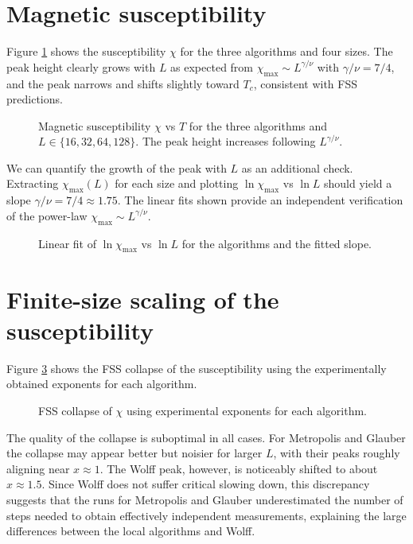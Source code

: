 \section{Magnetic susceptibility}

Figure \ref{fig:chi_bruta} shows the susceptibility $\chi$ for the three algorithms and four sizes. The peak height clearly grows with $L$ as expected from $\chi_{\max}\sim L^{\gamma/\nu}$ with $\gamma/\nu=7/4$, and the peak narrows and shifts slightly toward $T_c$, consistent with FSS predictions.

\begin{figure}
  \centering
  
  \caption{Magnetic susceptibility $\chi$ vs $T$ for the three algorithms and $L\in\{16,32,64,128\}$. The peak height increases following $L^{\gamma/\nu}$.}
  \label{fig:chi_bruta}
\end{figure}

We can quantify the growth of the peak with $L$ as an additional check. Extracting $\chi_{\max}(L)$ for each size and plotting $\ln\chi_{\max}$ vs $\ln L$ should yield a slope $\gamma/\nu=7/4\approx1.75$. The linear fits shown provide an independent verification of the power-law $\chi_{\max}\sim L^{\gamma/\nu}$.

\begin{figure}
  \centering
  
  \caption{Linear fit of $\ln\chi_{\max}$ vs $\ln L$ for the algorithms and the fitted slope.}
  \label{fig:chi_scaling}
\end{figure}

\section{Finite-size scaling of the susceptibility}

Figure \ref{fig:fss_suscept} shows the FSS collapse of the susceptibility using the experimentally obtained exponents for each algorithm.

\begin{figure}
  \centering
  
  \caption{FSS collapse of $\chi$ using experimental exponents for each algorithm.}
  \label{fig:fss_suscept}
\end{figure}

The quality of the collapse is suboptimal in all cases. For Metropolis and Glauber the collapse may appear better but noisier for larger $L$, with their peaks roughly aligning near $x\approx1$. The Wolff peak, however, is noticeably shifted to about $x\approx1.5$. Since Wolff does not suffer critical slowing down, this discrepancy suggests that the runs for Metropolis and Glauber underestimated the number of steps needed to obtain effectively independent measurements, explaining the large differences between the local algorithms and Wolff.

